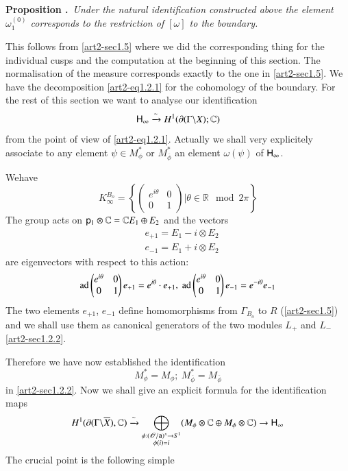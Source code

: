 \medskip
\noindent
{\bf Proposition .\label{art2-prop1.6.1}}~{\em Under the natural identification constructed above the element $\omega^{(0)}_{1}$ corresponds to the restriction of $[\omega]$ to the boundary.}
\smallskip

This follows from \ref{art2-sec1.5} where we did the corresponding thing for the individual cusps and the computation at the beginning of this section. The normalisation of the measure corresponds exactly to the one in \ref{art2-sec1.5}. We have the decomposition \eqref{art2-eq1.2.1} for the cohomology of the boundary. For the rest of this section we want to analyse our identification
$$
\mathsf{H}_{\infty}\xrightarrow{\sim}H^{1}(\partial(\Gamma\backslash X);\mathbb{C})
$$
from the point of view of \eqref{art2-eq1.2.1}. Actually we shall very explicitely associate to any element $\psi\in M^{*}_{\phi}$ or $M^{*}_{\overline{\phi}}$ an element $\omega(\psi)$ of $\mathsf{H}_{\infty}$.

We\pageoriginale have
$$
K^{B_{o}}_{\infty}=\left\{\left(
\begin{matrix}
e^{i\theta} & 0\\
0 & 1
\end{matrix}
\right)\Big| \theta\in \mathbb{R}\mod 2\pi\right\}
$$
The group acts on $\mathsf{p}_{1}\otimes \mathbb{C}=\mathbb{C}E_{1}\oplus E_{2}$ and the vectors
\begin{align*}
& e_{+1}=E_{1}-i\otimes E_{2}\\
& e_{-1}=E_{1}+i\otimes E_{2}
\end{align*}
are eigenvectors with respect to this action:
$$
\ad \left(\begin{matrix} e^{i\theta} & 0\\ 0 & 1\end{matrix}\right)e_{+1}=e^{i\theta}\cdot e_{+1}, \ \ad\left(\begin{matrix} e^{i\theta} & 0\\ 0 & 1\end{matrix}\right)e_{-1}=e^{-i\theta}e_{-1}
$$
The two elements $e_{+1}$, $e_{-1}$ define homomorphisms from $\Gamma_{B_{o}}$ to $R$ (\ref{art2-sec1.5}) and we shall use them as canonical generators of the two modules $L_{+}$ and $L_{-}$ \eqref{art2-sec1.2.2}.

Therefore we have now established the identification
$$
M^{*}_{\phi}=M_{\phi}; \ M^{*}_{\overline{\phi}}=M_{\overline{\phi}}
$$
in \ref{art2-sec1.2.2}. Now we shall give an explicit formula for the identification maps
$$
H^{1}(\partial (\Gamma\backslash \overline{X}),\mathbb{C})\xrightarrow{\sim}\bigoplus\limits_{\substack{\phi:(\mathscr{O}/\mathsf{a})^{x}\to S^{1}\\ \phi(i)=i}}(M_{\phi}\otimes \mathbb{C}\oplus M_{\phi}\otimes \mathbb{C})\to \mathsf{H}_{\infty}
$$
The crucial point is the following simple

